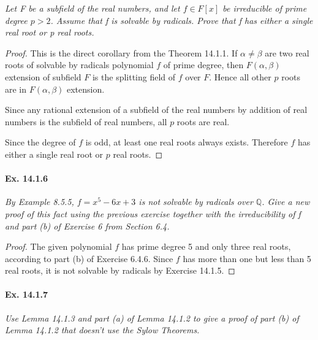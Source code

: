 \documentclass[11pt,a4paper]{article}
\begin{document}
{\it Let F be a subfield of the real numbers, and let $f\in F[x]$ be irreducible of prime degree $p>2$. Assume that f is solvable by radicals. Prove that f has either a single real root or p real roots. 
}

\begin{proof}
This is the direct corollary from the Theorem 14.1.1. If $\alpha\neq\beta$ are two real roots of solvable by radicals polynomial $f$ of prime degree, then $F(\alpha,\beta)$ extension of subfield $F$ is the splitting field of $f$ over $F$. Hence all other $p$ roots are in  $F(\alpha,\beta)$ extension. 

Since any rational extension of a subfield of the real numbers by addition of real numbers is the subfield of real numbers, all $p$ roots are real.

Since the degree of $f$ is odd, at least one real roots always exists. Therefore $f$ has either a single real root or $p$ real roots.
\end{proof}

\paragraph{Ex. 14.1.6}

{\it By Example 8.5.5, $f=x^5-6x+3$ is not solvable by radicals over $\mathbb{Q}$. Give a new proof of this fact using the previous exercise together with the irreducibility of f and part (b) of Exercise 6 from Section 6.4.
}

\begin{proof}
The given polynomial $f$ has prime degree 5 and only three real roots, according to part (b) of Exercise 6.4.6. Since $f$ has more than one but less than 5 real roots, it is not solvable by radicals by Exercise 14.1.5. 

\end{proof}

\paragraph{Ex. 14.1.7}

{\it Use Lemma 14.1.3 and part (a) of Lemma 14.1.2 to give a proof of part (b) of Lemma 14.1.2 that doesn't use the Sylow Theorems.
}
\end{document}
